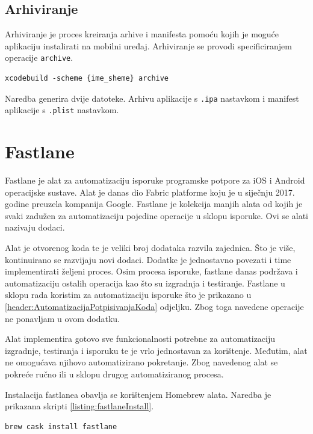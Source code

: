 \documentclass[times, utf8, diplomski, numeric]{fer}
\begin{document}
\begin{appendices}
\section{Arhiviranje}

Arhiviranje je proces kreiranja arhive i manifesta pomoću kojih je moguće aplikaciju instalirati na mobilni uređaj. Arhiviranje se provodi specificiranjem operacije \verb|archive|.

\begin{lstlisting}[caption=Pokretanje operacije arhiviranja korištenjem xcodebuild alata]
xcodebuild -scheme {ime_sheme} archive
\end{lstlisting}

Naredba generira dvije datoteke. Arhivu aplikacije s \verb|.ipa| nastavkom i manifest aplikacije s \verb|.plist| nastavkom.



\chapter{Fastlane} \label{header:dodatak_fastlane}

Fastlane je alat za automatizaciju isporuke programske potpore za iOS i Android operacijske sustave. Alat je danas dio Fabric platforme koju je u siječnju 2017. godine preuzela kompanija Google. Fastlane je kolekcija manjih alata od kojih je svaki zadužen za automatizaciju pojedine operacije u sklopu isporuke. Ovi se alati nazivaju dodaci\citep{fastlane}.

Alat je otvorenog koda te je veliki broj dodataka razvila zajednica. Što je više, kontinuirano se razvijaju novi dodaci. Dodatke je jednostavno povezati i time implementirati željeni proces. Osim procesa isporuke, fastlane danas podržava i automatizaciju ostalih operacija kao što su izgradnja i testiranje. Fastlane u sklopu rada koristim za automatizaciju isporuke što je prikazano u \ref{header:AutomatizacijaPotpisivanjaKoda} odjeljku. Zbog toga navedene operacije ne ponavljam u ovom dodatku.

Alat implementira gotovo sve funkcionalnosti potrebne za automatizaciju izgradnje, testiranja i isporuku te je vrlo jednostavan za korištenje. Međutim, alat ne omogućava njihovo automatizirano pokretanje. Zbog navedenog alat se pokreće ručno ili u sklopu drugog automatiziranog procesa.

Instalacija fastlanea obavlja se korištenjem Homebrew alata. Naredba je prikazana skripti \ref{listing:fastlaneInstall}.

\begin{lstlisting}[caption=Dohvat i instalacija fastlane alata, label=listing:fastlaneInstall]
brew cask install fastlane
\end{lstlisting}


\end{appendices}
\end{document}
